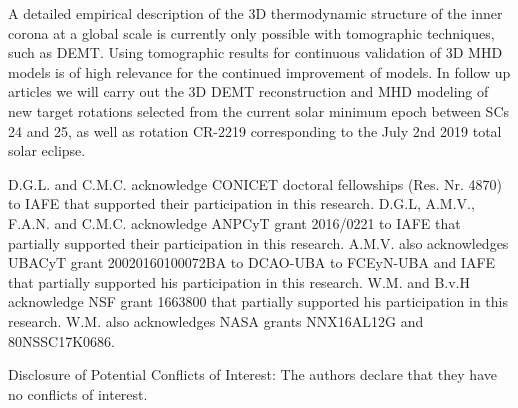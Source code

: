 \documentclass[namedreferences]{solarphysics}
\begin{document}
\begin{article}
A detailed empirical description of the 3D thermodynamic structure of the inner corona at a global scale is currently only possible with tomographic techniques, such as DEMT. Using tomographic results for continuous validation of 3D MHD models is of high relevance for the continued improvement of models. In {follow up articles} we will {carry out the 3D DEMT reconstruction and MHD modeling of} new target rotations {selected from} the current solar minimum {epoch} between SCs 24 and 25, {as well as rotation CR-2219 corresponding to the July 2nd 2019 total solar eclipse.}

\begin{acks}
D.G.L. and C.M.C. {acknowledge} CONICET doctoral {fellowships} (Res. Nr. 4870) to IAFE that supported {their} participation in this research. {D.G.L, A.M.V., F.A.N. and C.M.C. acknowledge ANPCyT grant 2016/0221 to IAFE that partially supported their participation in this research. A.M.V. also acknowledges UBACyT grant 20020160100072BA to DCAO-UBA to FCEyN-UBA and IAFE that partially supported his participation in this research.} W.M. and B.v.H acknowledge NSF grant 1663800 that partially supported his participation in this research. W.M. also acknowledges NASA grants NNX16AL12G and 80NSSC17K0686.
\end{acks}

\begin{footnotesize}
Disclosure of Potential Conflicts of Interest: The authors declare that they have no conflicts of interest.
\end{footnotesize}


  

\end{article} 
\end{document}
